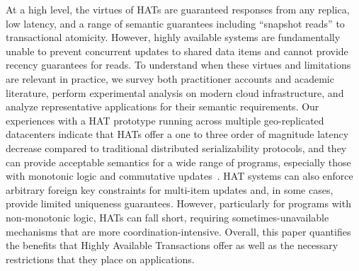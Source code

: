 At a high level, the virtues of HATs are guaranteed responses from any
replica, low latency, and a range of semantic guarantees including
``snapshot reads'' to transactional atomicity. However, highly
available systems are fundamentally unable to prevent concurrent
updates to shared data items and cannot provide recency guarantees for
reads. To understand when these virtues and limitations are relevant
in practice, we survey both practitioner accounts and academic
literature, perform experimental analysis on modern cloud
infrastructure, and analyze representative applications for their
semantic requirements. Our experiences with a HAT prototype running
across multiple geo-replicated datacenters indicate that HATs offer a
one to three order of magnitude latency decrease compared to
traditional distributed serializability protocols, and they can
provide acceptable semantics for a wide range of programs, especially
those with monotonic logic and commutative updates~\cite{calm,
  crdt}. HAT systems can also enforce arbitrary foreign key
constraints for multi-item updates and, in some cases, provide limited
uniqueness guarantees. However, particularly for programs with
non-monotonic logic, HATs can fall short, requiring
sometimes-unavailable mechanisms that are more
coordination-intensive. Overall, this paper quantifies the benefits
that Highly Available Transactions offer as well as the necessary
restrictions that they place on applications.




